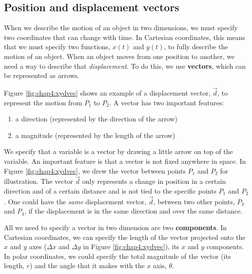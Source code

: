 \subsection{Position and displacement vectors}
When we describe the motion of an object in two dimensions, we must specify two coordinates that can change with time. In Cartesian coordinates, this means that we must specify two functions, $x(t)$ and $y(t)$, to fully describe the motion of an object. When an object moves from one position to another, we need a way to describe that \textit{displacement}. To do this, we use \textbf{vectors}, which can be represented as arrows.

Figure \ref{fig:chap4:xydvec} shows an example of a displacement vector, $\vec d$, to represent the motion from $P_1$ to $P_2$. A vector has two important features:
\begin{enumerate}
\item a direction (represented by the direction of the arrow)
\item a magnitude (represented by the length of the arrow)
\end{enumerate}
We specify that a variable is a vector by drawing a little arrow on top of the variable. An important feature is that a vector is not fixed anywhere in space. In Figure \ref{fig:chap4:xydvec}, we drew the vector between points $P_1$ and $P_2$ for illustration. The vector $\vec d$ only represents a change in position in a certain direction and of a certain distance and is not tied to the specific points $P_1$ and $P_2$. One could have the \textit{same} displacement vector, $\vec d$, between two other points, $P_3$ and $P_4$, if the displacement is in the same direction and over the same distance. 

All we need to specify a vector in two dimension are two \textbf{components}. In Cartesian coordinates, we can specify the length of the vector projected onto the $x$ and $y$ axes ($\Delta x$ and $\Delta y$ in Figure \ref{fig:chap4:xydvec}), its $x$ and $y$ components. In polar coordinates, we could specify the total magnitude of the vector (its length, $r$) and the angle that it makes with the $x$ axis, $\theta$.

